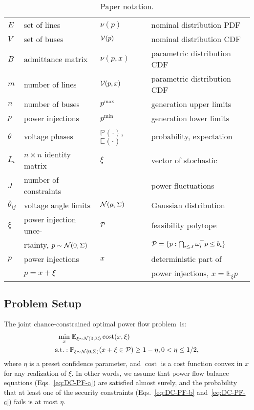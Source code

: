 \documentclass{IEEEtran4PSCC}
\DeclareMathOperator*{\cost}{cost}
\DeclareMathOperator*{\st}{s.t.:}
\newcommand{\cP}{{\cal P}}
\newcommand{\cN}{{\cal N}}
\begin{document}
\begin{table}[t]
  \centering
  \begin{tabular}{l|l|l|l}
    $E$ & set of lines & $\nu(p)$ & nominal distribution PDF\\
    $V$ & set of buses & ${\cal V}(p)$ & nominal distribution CDF \\
    $B$ & admittance matrix& $\nu(p,x)$ & parametric distribution CDF\\
    $m$ & number of lines & ${\cal V}(p,x)$& parametric distribution CDF\\
    $n$ & number of buses & $p^{\max}$ & generation upper limits\\
    $p$ & power injections & $p^{\min}$& generation lower limits\\
    $\theta$ & voltage phases & $\mathbb{P}(\cdot)$, $\mathbb{E}(\cdot)$ & probability, expectation\\
    $I_n$ & $n\times n$ identity matrix & $\xi$ & vector of stochastic \\
    $J$ & number of constraints & & power fluctuations\\
    $\bar\theta_{ij}$ & voltage angle limits & ${\cal N}(\mu, \Sigma)$ & Gaussian distribution\\
    $\xi$ & power injection unce-& $\cP$ & feasibility polytope\\ 
     &rtainty, $p\sim\cN(0, \Sigma)$
     & &$\cP = \{p:\bigcap_{i\le J} \omega_i^\top p\le b_i\}$\\
    $p$ & power injections & %
    $x$ & deterministic part of \\
    & $p = x + \xi$ & 
    & power injections, $x = \mathbb{E}_\xi p$
  \end{tabular}
  \caption{Paper notation.}
  \label{tab:notation}
\end{table}

\subsection{Problem Setup}
The joint chance-constrained optimal power flow problem~is:
\begin{align}\label{eq:JCC-OPF}
  \min_x & \;\mathbb{E}_{\xi\sim \cN(0, \Sigma)} \cost(x,\xi)\\
   \st\; & \mathbb{P}_{\xi\sim \cN(0, \Sigma)} (x+\xi \in \cP) \ge 1 - \eta, 0 < \eta \le 1/2,\nonumber
\end{align}
where $\eta$ is a preset confidence parameter, and $\cost$ is a cost function convex in $x$ for any realization of $\xi$. In other words, we assume that power flow balance equations (Eqs.~\eqref{eq:DC-PF-a}) are satisfied almost surely, and the probability that at least one of the security constraints (Eqs.~\eqref{eq:DC-PF-b} and~\eqref{eq:DC-PF-c}) fails is at most $\eta$. 
\end{document}
